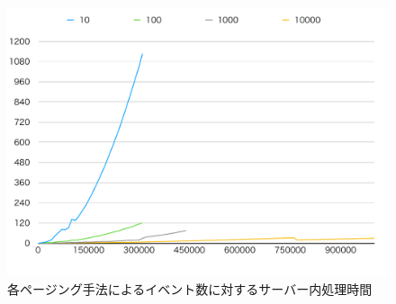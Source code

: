 \documentclass[../../../../../main]{subfiles}
\begin{document}
    \begin{figure}[H]
        \centering
        \includegraphics[width=12cm]{graph}
        \caption{各ページング手法によるイベント数に対するサーバー内処理時間}
        \label{fig:each-paging-server-time-app_1_1024-db_1_1024}
    \end{figure}
\end{document}
